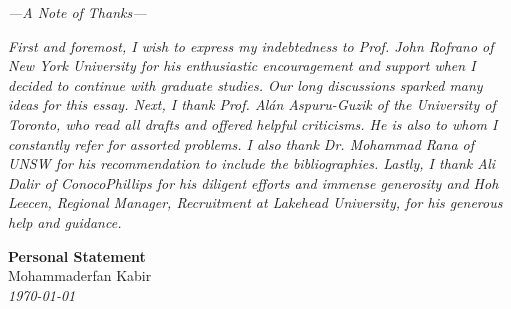 \documentclass[letterpaper, 10pt]{article}
\newcommand{\DocumentTitle}[3]{%
    \begin{center}    
        \Huge \textbf{#1}       %
        \\[10pt]                %
        \Large #2               %
        \\[5pt]                 %
        \normalsize \textit{#3} %
    \end{center}    
    \par \normalsize \normalfont
}
\begin{document}
\hfill
\begin{minipage}{264pt}
	\begin{center}
		\emph{—A Note of Thanks—}
	\end{center}
	\emph{First and foremost, I wish to express my indebtedness to Prof. John Rofrano of New York University for his enthusiastic encouragement and support when I decided to continue with graduate studies. Our long discussions sparked many ideas for this essay. Next, I thank Prof. Alán Aspuru-Guzik of the University of Toronto, who read all drafts and offered helpful criticisms. He is also to whom I constantly refer for assorted problems. I also thank Dr. Mohammad Rana of UNSW for his recommendation to include the bibliographies. Lastly, I thank Ali Dalir of ConocoPhillips for his diligent efforts and immense generosity and Hoh Leecen, Regional Manager, Recruitment at Lakehead University, for his generous help and guidance.}
\end{minipage}

\vspace{72pt}

\DocumentTitle{Personal Statement}{Mohammaderfan Kabir}{\today}
\end{document}
